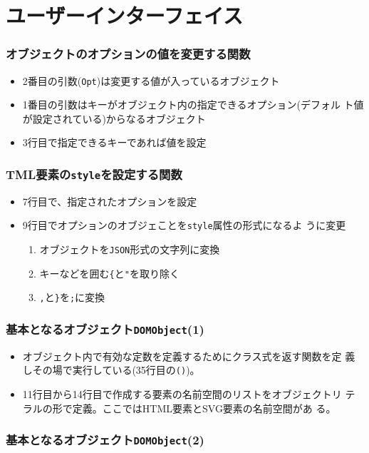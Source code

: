  \section{ユーザーインターフェイス}
 \begin{frame}[containsverbatim]
  \frametitle{オブジェクトのオプションの値を変更する関数}
\begin{itemize}
 \item 2番目の引数(\texttt{Opt})は変更する値が入っているオブジェクト
 \item 1番目の引数はキーがオブジェクト内の指定できるオプション(デフォル
       ト値が設定されている)からなるオブジェクト
 \item 3行目で指定できるキーであれば値を設定
\end{itemize}
 \end{frame}
 \begin{frame}[containsverbatim]
  \frametitle{TML要素の\texttt{style}を設定する関数}
\begin{itemize}
 \item 7行目で、指定されたオプションを設定
 \item 9行目でオプションのオブジェことを\texttt{style}属性の形式になるよ
       うに変更
\begin{enumerate}
 \item オブジェクトを\texttt{JSON}形式の文字列に変換
 \item キーなどを囲む\texttt{\{}と\texttt{"}を取り除く%
 \item \texttt{,}と\texttt{\}}を\texttt{;}に変換
\end{enumerate}
\end{itemize}
 \end{frame}
 \begin{frame}[containsverbatim]
  \frametitle{基本となるオブジェクト\texttt{DOMObject}(1)}
\begin{itemize}
 \item オブジェクト内で有効な定数を定義するためにクラス式を返す関数を定
       義しその場で実行している(35行目の\texttt{()})。
 \item 11行目から14行目で作成する要素の名前空間のリストをオブジェクトリ
       テラルの形で定義。ここではHTML要素とSVG要素の名前空間があ
       る。
\end{itemize}
 \end{frame}
 \begin{frame}[containsverbatim]
  \frametitle{基本となるオブジェクト\texttt{DOMObject}(2)}
 \end{frame}
